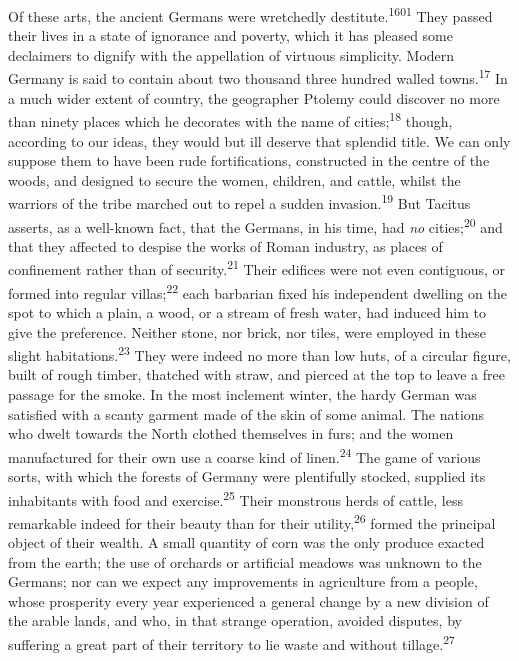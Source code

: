 Of these arts, the ancient Germans were wretchedly destitute.\textsuperscript{1601}
They passed their lives in a state of ignorance and poverty,
which it has pleased some declaimers to dignify with the
appellation of virtuous simplicity. Modern Germany is said to
contain about two thousand three hundred walled towns.\textsuperscript{17} In a
much wider extent of country, the geographer Ptolemy could
discover no more than ninety places which he decorates with the
name of cities;\textsuperscript{18} though, according to our ideas, they would but
ill deserve that splendid title. We can only suppose them to have
been rude fortifications, constructed in the centre of the woods,
and designed to secure the women, children, and cattle, whilst
the warriors of the tribe marched out to repel a sudden invasion.\textsuperscript{19}
But Tacitus asserts, as a well-known fact, that the Germans,
in his time, had \textit{no} cities;\textsuperscript{20} and that they affected to
despise the works of Roman industry, as places of confinement
rather than of security.\textsuperscript{21} Their edifices were not even
contiguous, or formed into regular villas;\textsuperscript{22} each barbarian
fixed his independent dwelling on the spot to which a plain, a
wood, or a stream of fresh water, had induced him to give the
preference. Neither stone, nor brick, nor tiles, were employed in
these slight habitations.\textsuperscript{23} They were indeed no more than low
huts, of a circular figure, built of rough timber, thatched with
straw, and pierced at the top to leave a free passage for the
smoke. In the most inclement winter, the hardy German was
satisfied with a scanty garment made of the skin of some animal.
The nations who dwelt towards the North clothed themselves in
furs; and the women manufactured for their own use a coarse kind
of linen.\textsuperscript{24} The game of various sorts, with which the forests of
Germany were plentifully stocked, supplied its inhabitants with
food and exercise.\textsuperscript{25} Their monstrous herds of cattle, less
remarkable indeed for their beauty than for their utility,\textsuperscript{26}
formed the principal object of their wealth. A small quantity of
corn was the only produce exacted from the earth; the use of
orchards or artificial meadows was unknown to the Germans; nor
can we expect any improvements in agriculture from a people,
whose prosperity every year experienced a general change by a new
division of the arable lands, and who, in that strange operation,
avoided disputes, by suffering a great part of their territory to
lie waste and without tillage.\textsuperscript{27}

